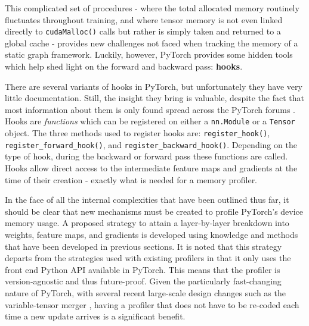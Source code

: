 \documentclass[12pt,letterpaper]{article}
\begin{document}
This complicated set of procedures - where the total allocated memory routinely fluctuates throughout training, and where tensor memory is not even linked directly to \texttt{cudaMalloc()} calls but rather is simply taken and returned to a global cache - provides new challenges not faced when tracking the memory of a static graph framework. Luckily, however, PyTorch provides some hidden tools which help shed light on the forward and backward pass: \textbf{hooks}.
\par 

There are several variants of hooks in PyTorch, but unfortunately they have very little documentation. Still, the insight they bring is valuable, despite the fact that most information about them is only found spread across the PyTorch forums \cite{pytorch_forum}. Hooks are \textit{functions} which can be registered on either a \texttt{nn.Module} or a \texttt{Tensor} object. The three methods used to register hooks are: \texttt{register\_hook()}, \texttt{register\_forward\_hook()}, and \texttt{register\_backward\_hook()}. Depending on the type of hook, during the backward or forward pass these functions are called. Hooks allow direct access to the intermediate feature maps and gradients at the time of their creation - exactly what is needed for a memory profiler.
\par 

In the face of all the internal complexities that have been outlined thus far, it should be clear that new mechanisms must be created to profile PyTorch's device memory usage. A proposed strategy to attain a layer-by-layer breakdown into weights, feature maps, and gradients is developed using knowledge and methods that have been developed in previous sections. It is noted that this strategy departs from the strategies used with existing profilers in that it only uses the front end Python API available in PyTorch. This means that the profiler is version-agnostic and thus future-proof. Given the particularly fast-changing nature of PyTorch, with several recent large-scale design changes such as the variable-tensor merger \cite{pytorch_variable_tensor_merger}, having a profiler that does not have to be re-coded each time a new update arrives is a significant benefit. 
\par 
\end{document}
